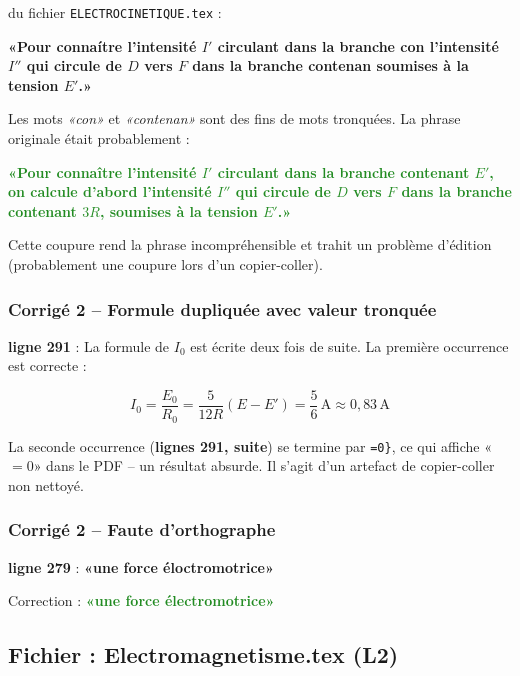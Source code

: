 \documentclass[12pt,a4paper]{article}
\newcommand{\fichier}[1]{\texttt{\small\color{Purple}#1}}
\newcommand{\ligne}[1]{\textbf{ligne #1}}
\newcommand{\correct}[1]{\textcolor{ForestGreen}{\textbf{#1}}}
\newcommand{\faux}[1]{\textcolor{BrickRed}{\textbf{#1}}}
\begin{document}
\begin{erreur}
 du fichier \fichier{ELECTROCINETIQUE.tex} :

\faux{«Pour connaítre l'intensité $I'$ circulant dans la branche con l'intensité $I''$ qui circule de $D$ vers $F$ dans la branche contenan soumises à la tension $E'$.»}

Les mots \textit{«con»} et \textit{«contenan»} sont des fins de mots tronquées. La phrase originale était probablement :

\correct{«Pour connaître l'intensité $I'$ circulant dans la branche \textbf{contenant} $E'$, on calcule d'abord l'intensité $I''$ qui circule de $D$ vers $F$ dans la branche \textbf{contenant} $3R$, soumises à la tension $E'$.»}

Cette coupure rend la phrase incompréhensible et trahit un problème d'édition (probablement une coupure lors d'un copier-coller).
\end{erreur}

\subsubsection{Corrigé 2 -- Formule dupliquée avec valeur tronquée}

\begin{erreur}
\ligne{291} : La formule de $I_0$ est écrite deux fois de suite. La première occurrence est correcte :

\[\boxed{I_0 = \frac{E_0}{R_0} = \frac{5}{12R}(E-E') = \frac{5}{6}\,\text{A} \approx 0{,}83\,\text{A}}\]

La seconde occurrence (\faux{lignes 291, suite}) se termine par \texttt{=0\}}, ce qui affiche «$= 0$» dans le PDF -- un résultat absurde. Il s'agit d'un artefact de copier-coller non nettoyé.
\end{erreur}

\subsubsection{Corrigé 2 -- Faute d'orthographe}

\begin{avertissement}
\ligne{279} : \faux{«une force éloctromotrice»}

Correction : \correct{«une force électromotrice»}
\end{avertissement}

\subsection{Fichier : Electromagnetisme.tex (L2)}
\end{document}
